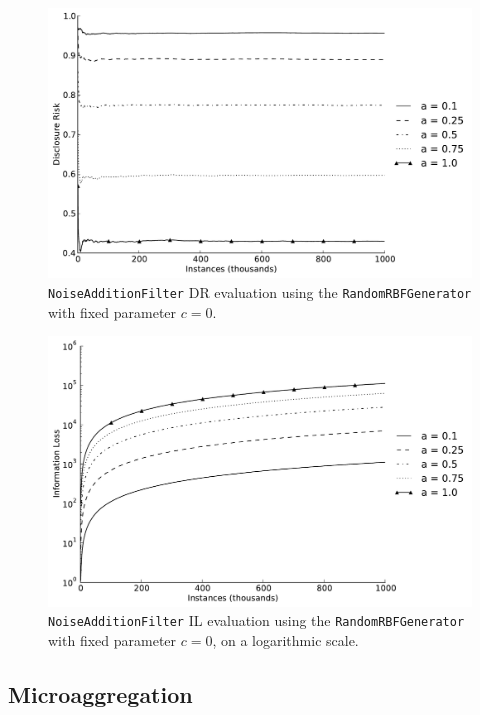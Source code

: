 \begin{figure}[h]
	\centering
	\includegraphics[width=0.9\linewidth]{figures/dr_na-random.pdf}
	\caption[Noise addition DR evaluation ($c = 0$).]{\texttt{NoiseAdditionFilter} DR evaluation using the \texttt{RandomRBFGenerator} with fixed parameter $c = 0$.}
	\label{fig:results-dr-na}
\end{figure}

\begin{figure}[h]
	\centering
	\includegraphics[width=0.9\linewidth]{figures/il-log_na-random.pdf}
	\caption[Noise addition IL evaluation ($c = 0$), logarithmic scale.]{\texttt{NoiseAdditionFilter} IL evaluation using the \texttt{RandomRBFGenerator} with fixed parameter $c = 0$, on a logarithmic scale.}
	\label{fig:results-il-log-na}
\end{figure}

\subsection{Microaggregation}
\label{Benchmarking:Results:MicroAgg}

